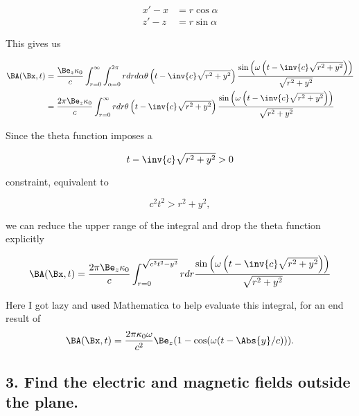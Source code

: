 \begin{align}\label{eqn:relElectroDynProblemSet5P1:90}
x' - x &= r \cos\alpha \\
z' - z &= r \sin\alpha 
\end{align}

This gives us

\begin{align*}
\BA(\Bx, t) 
&= \frac{
\Be_z \kappa_0
}{c} \int_{r=0}^\infty \int_{\alpha=0}^{2\pi} r dr d\alpha
\theta\left(t - \inv{c} \sqrt{r^2 + y^2}\right) 
\frac{\sin\left(\omega\left(t - \inv{c} \sqrt{r^2 + y^2 }\right)\right)}{\sqrt{r^2 + y^2}} \\
&= \frac{
2 \pi \Be_z \kappa_0
}{c} \int_{r=0}^\infty r dr 
\theta\left(t - \inv{c} \sqrt{r^2 + y^2}\right) 
\frac{\sin\left(\omega\left(t - \inv{c} \sqrt{r^2 + y^2 }\right)\right)}{\sqrt{r^2 + y^2}} \\
\end{align*}

Since the theta function imposes a 

\begin{equation}\label{eqn:relElectroDynProblemSet5P1:110}
t - \inv{c} \sqrt{r^2 + y^2 } > 0
\end{equation}

constraint, equivalent to

\begin{equation}\label{eqn:relElectroDynProblemSet5P1:130}
c^2 t^2 > r^2 + y^2,
\end{equation}

we can reduce the upper range of the integral and drop the theta function explicitly

\begin{equation}\label{eqn:relElectroDynProblemSet5P1:150}
\BA(\Bx, t) 
= \frac{
2 \pi \Be_z \kappa_0
}{c} \int_{r=0}^{\sqrt{c^2 t^2 - y^2}} r dr 
\frac{\sin\left(\omega\left(t - \inv{c} \sqrt{r^2 + y^2 }\right)\right)}{\sqrt{r^2 + y^2}} 
\end{equation}

Here I got lazy and used Mathematica to help evaluate this integral, for an end result of
\begin{equation}\label{eqn:relElectroDynProblemSet5P1:170}
\BA(\Bx, t) 
= \frac{
2 \pi \kappa_0 \omega
}{c^2} \Be_z (1 - \cos(\omega(t - \Abs{y}/c))).
\end{equation}

\subsection{3. Find the electric and magnetic fields outside the plane.}

